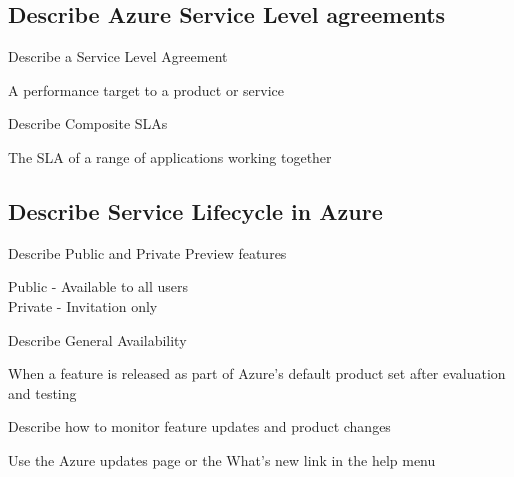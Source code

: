 \documentclass[addpoints]{exam}
\begin{document}
\begin{questions}
\begin{solution}[2in]
\end{solution}

\subsection{Describe Azure Service Level agreements}

\question Describe a Service Level Agreement
\begin{solution}[2in]
	A performance target to a product or service
	
\end{solution}

\question Describe Composite SLAs
\begin{solution}[2in]
	The SLA of a range of applications working together
	
\end{solution}

\subsection{Describe Service Lifecycle in Azure}
\question Describe Public and Private Preview features
\begin{solution}[2in]
	Public - Available to all users\\
	Private - Invitation only
	
\end{solution}

\question Describe General Availability
\begin{solution}[2in]
	When a feature is released as part of Azure's default product set after evaluation and testing
\end{solution}

\question Describe how to monitor feature updates and product changes
\begin{solution}[2in]
	Use the Azure updates page or the What's new link in the help menu
\end{solution}


\end{questions}
\end{document}
